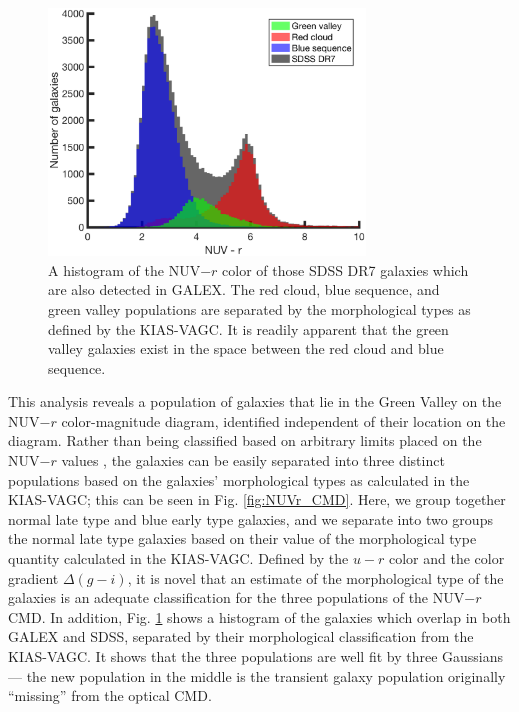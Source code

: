 \begin{figure}
    \includegraphics[width=0.75\textwidth]{Images/GV/NUVr_CMDclassifications}
    \caption[Distribution of NUV-$r$ of SDSS galaxies]{A histogram of the 
    NUV$-r$ color of those SDSS DR7 galaxies which are also detected in GALEX.  
    The red cloud, blue sequence, and green valley populations are separated by 
    the morphological types as defined by the KIAS-VAGC.  It is readily apparent 
    that the green valley galaxies exist in the space between the red cloud and 
    blue sequence.}
    \label{fig:NUVr_hist}
\end{figure}

This analysis reveals a population of galaxies that lie in the Green Valley on 
the NUV$-r$ color-magnitude diagram, identified independent of their location on 
the diagram.  Rather than being classified based on arbitrary limits placed on 
the NUV$-r$ values \citep[as done by][]{Schawinski14,Salim14a}, the galaxies can 
be easily separated into three distinct populations based on the galaxies' 
morphological types as calculated in the KIAS-VAGC; this can be seen in Fig. 
\ref{fig:NUVr_CMD}.  Here, we group together normal late type and blue early 
type galaxies, and we separate into two groups the normal late type galaxies 
based on their value of the morphological type quantity calculated in the 
KIAS-VAGC.  Defined by the $u-r$ color and the color gradient $\Delta (g-i)$, it 
is novel that an estimate of the morphological type of the galaxies is an 
adequate classification for the three populations of the NUV$-r$ CMD.  In 
addition, Fig. \ref{fig:NUVr_hist} shows a histogram of the galaxies which 
overlap in both GALEX and SDSS, separated by their morphological classification 
from the KIAS-VAGC.  It shows that the three populations are well fit by three 
Gaussians --- the new population in the middle is the transient galaxy 
population originally ``missing'' from the optical CMD.

